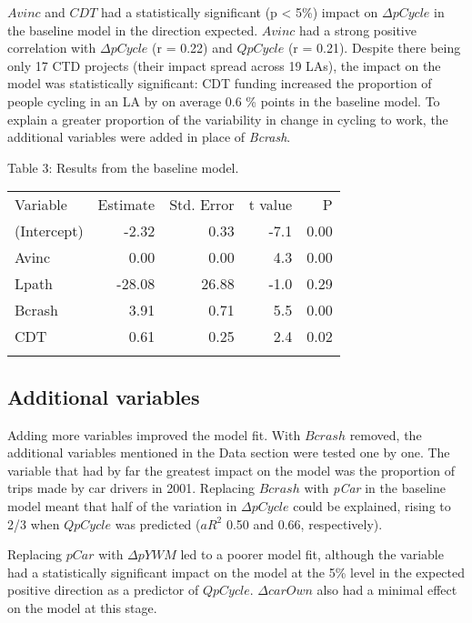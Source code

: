 $Avinc$ and $CDT$ had a statistically significant (p \textless{} 5\%)
impact on $\Delta pCycle$ in the baseline model in the direction
expected. $Avinc$ had a strong positive correlation with $\Delta pCycle$
(r = 0.22) and $Q pCycle$ (r = 0.21). Despite there being only 17 CTD
projects (their impact spread across 19 LAs), the impact on the model
was statistically significant: CDT funding increased the proportion of
people cycling in an LA by on average 0.6 \% points in the baseline
model. To explain a greater proportion of the variability in change in
cycling to work, the additional variables were added in place of
\emph{Bcrash}.

Table 3: Results from the baseline model.

\begin{longtable}[c]{@{}lrrrr@{}}
\toprule\addlinespace
Variable & Estimate & Std. Error & t value & P
\\\addlinespace
\midrule\endhead
(Intercept) & -2.32 & 0.33 & -7.1 & 0.00
\\\addlinespace
Avinc & 0.00 & 0.00 & 4.3 & 0.00
\\\addlinespace
Lpath & -28.08 & 26.88 & -1.0 & 0.29
\\\addlinespace
Bcrash & 3.91 & 0.71 & 5.5 & 0.00
\\\addlinespace
CDT & 0.61 & 0.25 & 2.4 & 0.02
\\\addlinespace
\bottomrule
\end{longtable}

\subsection{Additional variables}\label{additional-variables-1}

Adding more variables improved the model fit. With $Bcrash$ removed, the
additional variables mentioned in the Data section were tested one by
one. The variable that had by far the greatest impact on the model was
the proportion of trips made by car drivers in 2001. Replacing $Bcrash$
with \emph{pCar} in the baseline model meant that half of the variation
in $\Delta pCycle$ could be explained, rising to 2/3 when $Q pCycle$ was
predicted ($aR^2$ 0.50 and 0.66, respectively).

Replacing $pCar$ with $\Delta pYWM$ led to a poorer model fit, although
the variable had a statistically significant impact on the model at the
5\% level in the expected positive direction as a predictor of
$Q pCycle$. $\Delta carOwn$ also had a minimal effect on the model at
this stage.

